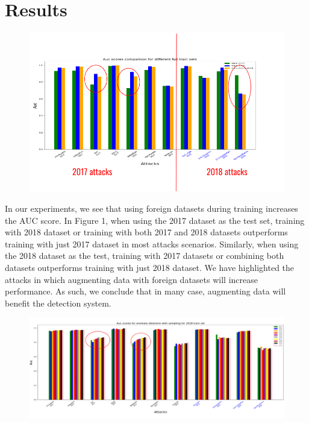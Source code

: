 \section{Results}

\begin{figure}[H]
    \centering
    \includegraphics[width=1\linewidth]{augment.png}
    \caption{}
\end{figure}

In our experiments, we see that using foreign datasets during training increases the AUC score. In Figure 1, when using the 2017 dataset as the test set, training with 2018 dataset or training with both 2017 and 2018 datasets outperforms training with just 2017 dataset in most attacks scenarios. Similarly, when using the 2018 dataset as the test, training with 2017 datasets or combining both datasets outperforms training with just 2018 dataset. We have highlighted the attacks in which augmenting data with foreign datasets will increase performance. As such, we conclude that in many case, augmenting data will benefit the detection system.

\begin{figure}[H]
    \centering
    \includegraphics[width=1\linewidth]{amount.png}
    \caption{}
\end{figure}


